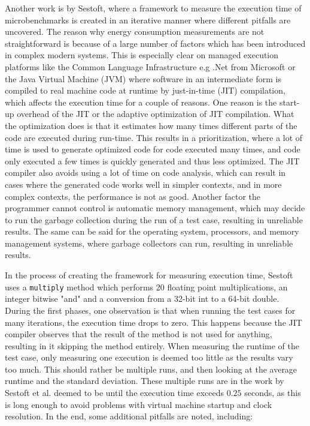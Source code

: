 Another work is by Sestoft\cite[]{sestoft2013microbenchmarks}, where a framework to measure the execution time of microbenchmarks is created in an iterative manner where different pitfalls are uncovered. The reason why energy consumption measurements are not straightforward is because of a large number of factors which has been introduced in complex modern systems. This is especially clear on managed execution platforms like the Common Language Infrastructure e.g .Net from Microsoft or the Java Virtual Machine (JVM) where software in an intermediate form is compiled to real machine code at runtime by just-in-time (JIT) compilation, which affects the execution time for a couple of reasons. One reason is the start-up overhead of the JIT or the adaptive optimization of JIT compilation. What the optimization does is that it estimates how many times different parts of the code are executed during run-time. This results in a prioritization, where a lot of time is used to generate optimized code for code executed many times, and code only executed a few times is quickly generated and thus less optimized. The JIT compiler also avoids using a lot of time on code analysis, which can result in cases where the generated code works well in simpler contexts, and in more complex contexts, the performance is not as good. Another factor the programmer cannot control is automatic memory management, which may decide to run the garbage collection during the run of a test case, resulting in unreliable results. The same can be said for the operating system, processors, and memory management systems, where garbage collectors can run, resulting in unreliable results.\newline

In the process of creating the framework for measuring execution time, Sestoft\cite[]{sestoft2013microbenchmarks} uses a \texttt{multiply} method which performs 20 floating point multiplications, an integer bitwise "and" and a conversion from a 32-bit int to a 64-bit double. During the first phases, one observation is that when running the test cases for many iterations, the execution time drops to zero. This happens because the JIT compiler observes that the result of the method is not used for anything, resulting in it skipping the method entirely. When measuring the runtime of the test case, only measuring one execution is deemed too little as the results vary too much. This should rather be multiple runs, and then looking at the average runtime and the standard deviation. These multiple runs are in the work by Sestoft et al.\cite{sestoft2013microbenchmarks} deemed to be until the execution time exceeds $0.25$ seconds, as this is long enough to avoid problems with virtual machine startup and clock resolution. In the end, some additional pitfalls are noted, including:\cite{sestoft2013microbenchmarks}

